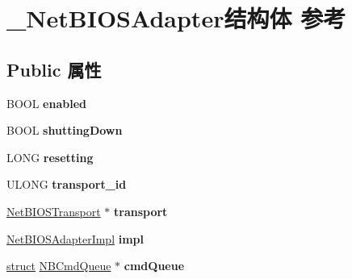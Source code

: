 \hypertarget{struct___net_b_i_o_s_adapter}{}\section{\+\_\+\+Net\+B\+I\+O\+S\+Adapter结构体 参考}
\label{struct___net_b_i_o_s_adapter}
\subsection*{Public 属性}
\begin{DoxyCompactItemize}
\item 
\mbox{\label{struct___net_b_i_o_s_adapter_a8a198536ebeaaaa9145e60814682a5e9}} 
B\+O\+OL {\bfseries enabled}
\item 
\mbox{\label{struct___net_b_i_o_s_adapter_a6dc16c60368b3dc64b7c71639630a995}} 
B\+O\+OL {\bfseries shutting\+Down}
\item 
\mbox{\label{struct___net_b_i_o_s_adapter_af8920f3f0ec0cd2d04a8ccdef0d215c2}} 
L\+O\+NG {\bfseries resetting}
\item 
\mbox{\label{struct___net_b_i_o_s_adapter_a8206412a1e733ed2a584c885b37ffabd}} 
U\+L\+O\+NG {\bfseries transport\+\_\+id}
\item 
\mbox{\label{struct___net_b_i_o_s_adapter_a5b2b20ffbb966f1c4828323a34843b76}} 
\hyperlink{struct___net_b_i_o_s_transport}{Net\+B\+I\+O\+S\+Transport} $\ast$ {\bfseries transport}
\item 
\mbox{\label{struct___net_b_i_o_s_adapter_a38d7d790fb1b0ee34f530b3a5f39ba99}} 
\hyperlink{struct___net_b_i_o_s_adapter_impl}{Net\+B\+I\+O\+S\+Adapter\+Impl} {\bfseries impl}
\item 
\mbox{\label{struct___net_b_i_o_s_adapter_aab6e585a680aab57ec32c169f2995643}} 
\hyperlink{interfacestruct}{struct} \hyperlink{struct_n_b_cmd_queue}{N\+B\+Cmd\+Queue} $\ast$ {\bfseries cmd\+Queue}
\item 
\mbox{\label{struct___net_b_i_o_s_adapter_ace1eb39ff115cbf10ff9a01f7a26a1a8}} 

\end{DoxyCompactItemize}
